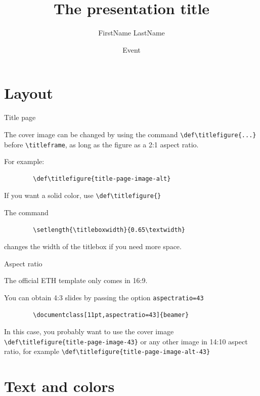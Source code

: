 \documentclass[12pt,aspectratio=169]{beamer}
\title{The presentation title}
\date[June 2025]{Event}
\author{FirstName LastName}
\institute{Machine Learning}
\begin{document}

\titleframe

\tocframe

\section{Layout}

\begin{frame}[fragile]{Title page}

	The cover image can be changed by using the command \verb+\def\titlefigure{...}+ before \verb+\titleframe+, as long as the figure as a 2:1 aspect ratio.
	
	For example:
	\begin{verbatim}
		\def\titlefigure{title-page-image-alt}
	\end{verbatim}
	
	\medskip
	
	If you want a solid color, use \verb+\def\titlefigure{}+
	
	\medskip

	The command	
	\begin{verbatim}
		\setlength{\titleboxwidth}{0.65\textwidth}
	\end{verbatim}
	changes the width of the titlebox if you need more space.

\end{frame}

\begin{frame}[fragile]{Aspect ratio}

	The official ETH template only comes in 16:9.
	
	You can obtain 4:3 slides by passing the option \verb+aspectratio=43+
	\begin{verbatim}
		\documentclass[11pt,aspectratio=43]{beamer}	
	\end{verbatim}
		
	\bigskip
	
	In this case, you probably want to use the cover image \verb+\def\titlefigure{title-page-image-43}+
	or any other image in 14:10 aspect ratio, for example \verb+\def\titlefigure{title-page-image-alt-43}+
	
	
\end{frame}

\section{Text and colors}
\end{document}
